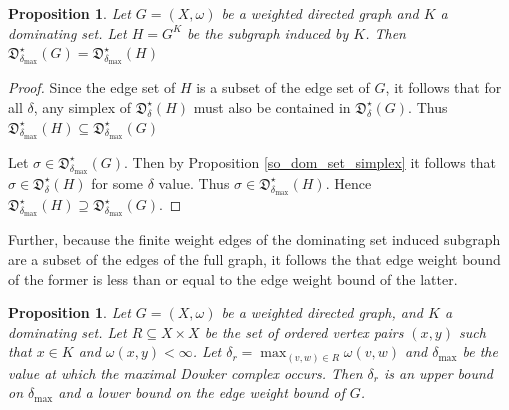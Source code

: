 \documentclass[pdflatex,bst/sn-mathphys-num]{sn-jnl}%
\theoremstyle{thmstyleone}%
\newtheorem{prop}[theorem]{Proposition}%
\theoremstyle{definition}
\theoremstyle{thmstyletwo}%
\newcommand{\FD}{\mathfrak{D}}
\theoremstyle{thmstylethree}%
\begin{document}
\begin{prop}\label{dom_graph_equiv}
    Let $G=(X,\omega)$ be a weighted directed graph and $K$ a dominating set. Let $H = G^K$ be the subgraph induced by $K$. Then $\FD^\star_{\delta_\text{max}}(G)=\FD^\star_{\delta_\text{max}}(H)$
\end{prop}
\begin{proof}
    Since the edge set of $H$ is a subset of the edge set of $G$, it follows that for all $\delta$, any simplex of $\FD^\star_\delta(H)$ must also be contained in $\FD^\star_\delta(G)$. Thus $\FD^\star_{\delta_\text{max}}(H)\subseteq \FD^\star_{\delta_\text{max}}(G)$

    Let $\sigma\in \FD^\star_{\delta_\text{max}}(G)$. Then by Proposition \ref{so_dom_set_simplex} it follows that $\sigma\in\FD^\star_{\delta}(H)$ for some $\delta$ value. Thus $\sigma\in \FD^\star_{\delta_\text{max}}(H)$. Hence $\FD^\star_{\delta_\text{max}}(H)\supseteq \FD^\star_{\delta_\text{max}}(G)$.
\end{proof}

Further, because the finite weight edges of the dominating set induced subgraph are a subset of the edges of the full graph, it follows the that edge weight bound of the former  is less than or equal to the edge weight bound of the latter.

\begin{prop}
    Let $G=(X,\omega)$ be a weighted directed graph, and $K$ a dominating set. Let $R\subseteq X\times X$ be the set of ordered vertex pairs $(x,y)$ such that $x\in K$ and $\omega(x,y)<\infty$.
    Let $\delta_r = \max_{(v,w)\in R}\omega(v,w)$ and $\delta_\text{max}$ be the value at which the maximal Dowker complex occurs. Then $\delta_r$ is an upper bound on $\delta_{\text{max}}$ and a lower bound on the edge weight bound of $G$.
\end{prop}
\end{document}
